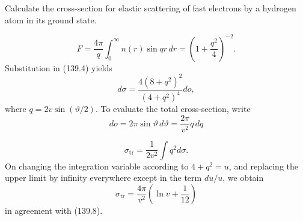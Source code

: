 \ProblemHeading

Calculate the cross-section for elastic scattering of fast electrons by a hydrogen atom in its ground state.


\[
 F=\frac{4\pi}{q}\int_0^\infty n(r)\sin qr\,dr
 =\left(1+\frac{q^2}{4}\right)^{-2}.
\]
Substitution in (139.4) yields
\[
 d\sigma=\frac{4(8+q^2)^2}{(4+q^2)^4}d o,
\]
where $q=2v\sin(\vartheta/2)$. To evaluate the total cross-section, write
\[
 d o=2\pi\sin\vartheta\,d\vartheta=\frac{2\pi}{v^2}q\,dq
\]

\[
 \sigma_{\mathrm{tr}}=\frac1{2v^2}\int q^2d\sigma.
\]
On changing the integration variable according to $4+q^2=u$, and replacing the upper limit by infinity everywhere except in the term $du/u$, we obtain
\[
 \sigma_{\mathrm{tr}}=\frac{4\pi}{v^2}\left(\ln v+\frac1{12}\right)
\]
in agreement with (139.8).
